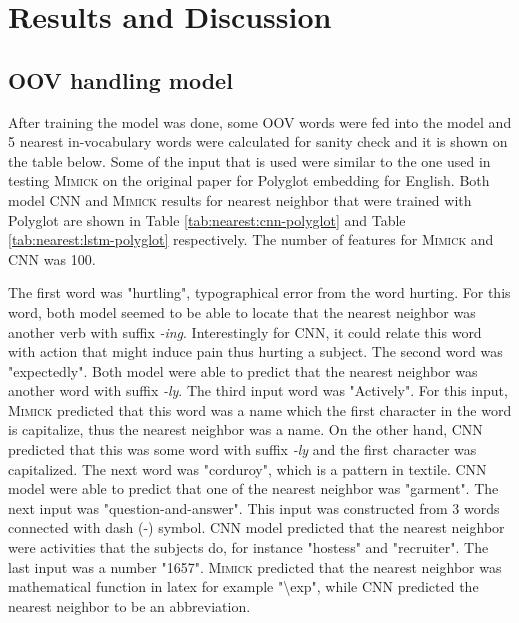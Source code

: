 \chapter{Results and Discussion}
\label{chap:results}
    \section{OOV handling model}
        After training the model was done, some OOV words were fed
        into the model and 5 nearest in-vocabulary words were
        calculated for sanity check and it is shown on the table
        below. Some of the input that is used were similar to the one used in testing
        \textsc{Mimick} on the original paper for Polyglot embedding
        for English. Both model CNN and \textsc{Mimick} results
        for nearest neighbor that were trained with Polyglot are shown
        in Table \ref{tab:nearest:cnn-polyglot} and Table
        \ref{tab:nearest:lstm-polyglot} respectively. The number of
        features for \textsc{Mimick} and CNN was 100.

        The first word was "hurtling", typographical error from the
        word hurting. For this word, both model seemed to be able to
        locate that the nearest neighbor was another verb with suffix
        \textit{-ing}. Interestingly for CNN, it could relate this
        word with action that might induce pain thus hurting a
        subject. The second word was "expectedly". Both model were
        able to predict that the nearest neighbor was another word
        with suffix \textit{-ly}. The third input word was "Actively".
        For this input, \textsc{Mimick} predicted that this word was a
        name which the first character in the word is capitalize, thus
        the nearest neighbor was a name. On the other hand, CNN
        predicted that this was some word with suffix \textit{-ly} and
        the first character was capitalized. The next word was
        "corduroy", which is a pattern in textile. CNN model were able
        to predict that one of the nearest neighbor was "garment". The
        next input was "question-and-answer". This input was constructed
        from 3 words connected with dash (-) symbol. CNN model
        predicted that the nearest neighbor were activities that the
        subjects do, for instance "hostess" and "recruiter". The last
        input was a number "1657". \textsc{Mimick} predicted that the
        nearest neighbor was mathematical function in latex for example
        "\textbackslash exp", while CNN predicted the nearest neighbor
        to be an abbreviation.


